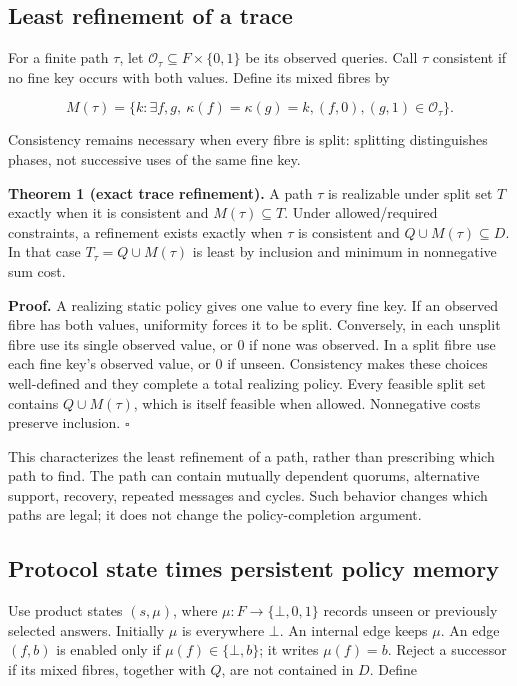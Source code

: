 \subsection{Least refinement of a
trace}\label{least-refinement-of-a-trace}

For a finite path \(\tau\), let
\(\mathcal O_\tau\subseteq F\times\{0,1\}\) be its observed queries.
Call \(\tau\) consistent if no fine key occurs with both values. Define
its mixed fibres by

\[
M(\tau)=\{k:\exists f,g,\ \kappa(f)=\kappa(g)=k,
 (f,0),(g,1)\in\mathcal O_\tau\}.
\]

Consistency remains necessary when every fibre is split: splitting
distinguishes phases, not successive uses of the same fine key.

\textbf{Theorem 1 (exact trace refinement).} A path \(\tau\) is
realizable under split set \(T\) exactly when it is consistent and
\(M(\tau)\subseteq T\). Under allowed/required constraints, a refinement
exists exactly when \(\tau\) is consistent and
\(Q\cup M(\tau)\subseteq D\). In that case \(T_\tau=Q\cup M(\tau)\) is
least by inclusion and minimum in nonnegative sum cost.

\textbf{Proof.} A realizing static policy gives one value to every fine
key. If an observed fibre has both values, uniformity forces it to be
split. Conversely, in each unsplit fibre use its single observed value,
or 0 if none was observed. In a split fibre use each fine key's observed
value, or 0 if unseen. Consistency makes these choices well-defined and
they complete a total realizing policy. Every feasible split set
contains \(Q\cup M(\tau)\), which is itself feasible when allowed.
Nonnegative costs preserve inclusion. \(\square\)

This characterizes the least refinement of a path, rather than
prescribing which path to find. The path can contain mutually dependent
quorums, alternative support, recovery, repeated messages and cycles.
Such behavior changes which paths are legal; it does not change the
policy-completion argument.

\subsection{Protocol state times persistent policy
memory}\label{protocol-state-times-persistent-policy-memory}

Use product states \((s,\mu)\), where \(\mu:F\to\{\bot,0,1\}\) records
unseen or previously selected answers. Initially \(\mu\) is everywhere
\(\bot\). An internal edge keeps \(\mu\). An edge \((f,b)\) is enabled
only if \(\mu(f)\in\{\bot,b\}\); it writes \(\mu(f)=b\). Reject a
successor if its mixed fibres, together with \(Q\), are not contained in
\(D\). Define

